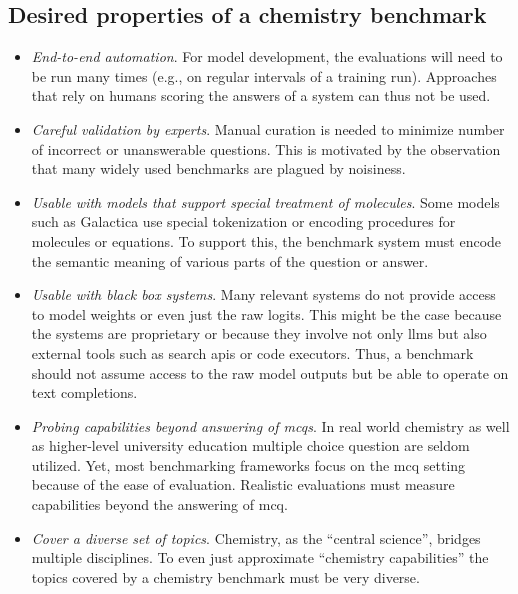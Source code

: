 
\subsection{Desired properties of a chemistry benchmark} \label{sec:desired-properties}

\begin{itemize}
    \item \emph{End-to-end automation}. For model development, the evaluations will need to be run many times (e.g., on regular intervals of a training run).
    Approaches that rely on humans scoring the answers of a system\autocite{Schulze_Balhorn_2024, ai4science2023impact, castro2023large} can thus not be used.
    \item \emph{Careful validation by experts}. Manual curation is needed to minimize number of incorrect or unanswerable questions.\autocite{northcutt2021pervasive}
    This is motivated by the observation that many widely used benchmarks are plagued by noisiness.\autocite{Frye_2023, Awg}
    \item \emph{Usable with models that support special treatment of molecules}. Some models such as Galactica\autocite{taylor2022galactica} use special tokenization or encoding procedures for molecules or equations.
    To support this, the benchmark system must encode the semantic meaning of various parts of the question or answer.
    \item \emph{Usable with black box systems}. Many relevant systems do not provide access to model weights or even just the raw logits.
    This might be the case because the systems are proprietary or because they involve not only \glspl{llm} but also external tools such as search \glspl{api} or code executors.\autocite{schick2024toolformer, karpas2022mrkl, yao2022react}
    Thus, a benchmark should not assume access to the raw model outputs but be able to operate on text completions.
    \item \emph{Probing capabilities beyond answering of \glspl{mcq}}. In real world chemistry as well as higher-level university education multiple choice question are seldom utilized.
    Yet, most benchmarking frameworks focus on the \gls{mcq} setting because of the ease of evaluation. Realistic evaluations must measure capabilities beyond the answering of \gls{mcq}.
    \item \emph{Cover a diverse set of topics}. Chemistry, as the \enquote{central science}, bridges multiple disciplines.\autocite{Aspuru_Guzik_2018} To even just approximate \enquote{chemistry capabilities} the topics covered by a chemistry benchmark must be very diverse.
\end{itemize}

